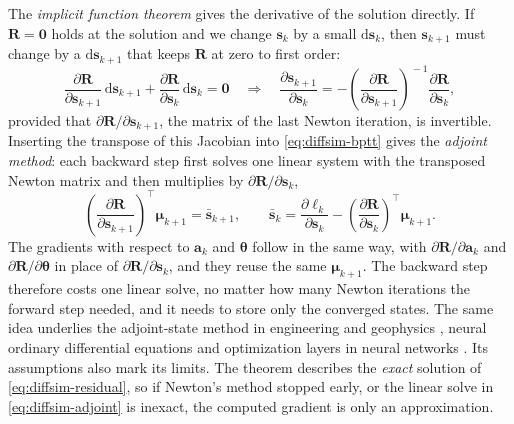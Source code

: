 The \emph{implicit function theorem} gives the derivative of the solution
directly. If $\mathbf{R} = \mathbf{0}$ holds at the solution and we change
$\mathbf{s}_k$ by a small $\mathrm{d}\mathbf{s}_k$, then $\mathbf{s}_{k+1}$
must change by a $\mathrm{d}\mathbf{s}_{k+1}$ that keeps $\mathbf{R}$ at
zero to first order:
\begin{equation*}
  \frac{\partial \mathbf{R}}{\partial \mathbf{s}_{k+1}}\,\mathrm{d}\mathbf{s}_{k+1}
  + \frac{\partial \mathbf{R}}{\partial \mathbf{s}_k}\,\mathrm{d}\mathbf{s}_k = \mathbf{0}
  \quad\Longrightarrow\quad
  \frac{\partial \mathbf{s}_{k+1}}{\partial \mathbf{s}_k}
  = -\left(\frac{\partial \mathbf{R}}{\partial \mathbf{s}_{k+1}}\right)^{\!-1}
     \frac{\partial \mathbf{R}}{\partial \mathbf{s}_k} ,
\end{equation*}
provided that $\partial \mathbf{R}/\partial \mathbf{s}_{k+1}$, the matrix
of the last Newton iteration, is invertible. Inserting the transpose of
this Jacobian into \eqref{eq:diffsim-bptt} gives the \emph{adjoint method}:
each backward step first solves one linear system with the transposed
Newton matrix and then multiplies by $\partial \mathbf{R}/\partial \mathbf{s}_k$,
\begin{equation}
  \left(\frac{\partial \mathbf{R}}{\partial \mathbf{s}_{k+1}}\right)^{\!\top} \boldsymbol{\mu}_{k+1}
  = \bar{\mathbf{s}}_{k+1},
  \qquad
  \bar{\mathbf{s}}_k
  = \frac{\partial \ell_k}{\partial \mathbf{s}_k}
  - \left(\frac{\partial \mathbf{R}}{\partial \mathbf{s}_k}\right)^{\!\top} \boldsymbol{\mu}_{k+1} .
  \label{eq:diffsim-adjoint}
\end{equation}
The gradients with respect to $\mathbf{a}_k$ and $\boldsymbol{\theta}$
follow in the same way, with $\partial \mathbf{R}/\partial \mathbf{a}_k$
and $\partial \mathbf{R}/\partial \boldsymbol{\theta}$ in place of
$\partial \mathbf{R}/\partial \mathbf{s}_k$, and they reuse the same
$\boldsymbol{\mu}_{k+1}$. The backward step therefore costs one linear
solve, no matter how many Newton iterations the forward step needed, and
it needs to store only the converged states. The same idea underlies the
adjoint-state method in engineering and geophysics \citep{plessix2006review},
neural ordinary differential equations \citep{chen2018neural} and
optimization layers in neural networks \citep{amos2017optnet}. Its
assumptions also mark its limits. The theorem describes the
\emph{exact} solution of \eqref{eq:diffsim-residual}, so if Newton's
method stopped early, or the linear solve in \eqref{eq:diffsim-adjoint}
is inexact, the computed gradient is only an approximation.

